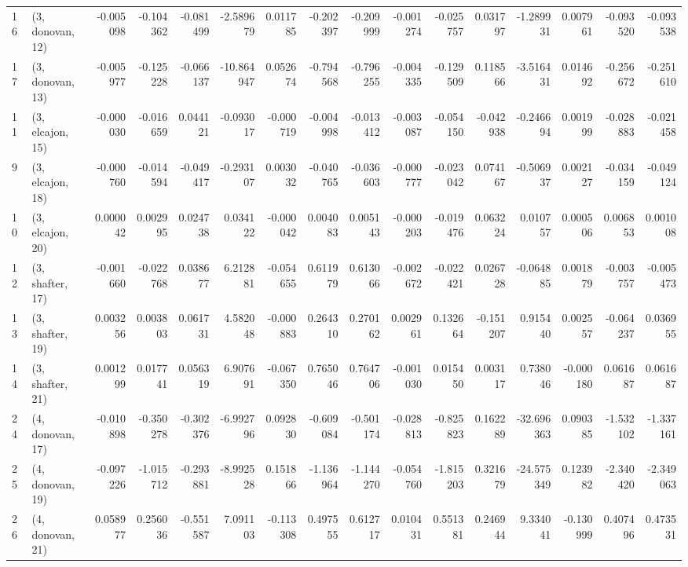 \begin{tabular}{llrrrrrrrrrrrrrr}
16 &  (3, donovan, 12) &  -0.005098 & -0.104362 & -0.081499 &  -2.589679 &  0.011785 &  -0.202397 & -0.209999 & -0.001274 & -0.025757 &  0.031797 &  -1.289931 &  0.007961 & -0.093520 & -0.093538 \\
17 &  (3, donovan, 13) &  -0.005977 & -0.125228 & -0.066137 & -10.864947 &  0.052674 &  -0.794568 & -0.796255 & -0.004335 & -0.129509 &  0.118566 &  -3.516431 &  0.014692 & -0.256672 & -0.251610 \\
11 &  (3, elcajon, 15) &  -0.000030 & -0.016659 &  0.044121 &  -0.093017 & -0.000719 &  -0.004998 & -0.013412 & -0.003087 & -0.054150 & -0.042938 &  -0.246694 &  0.001999 & -0.028883 & -0.021458 \\
9  &  (3, elcajon, 18) &  -0.000760 & -0.014594 & -0.049417 &  -0.293107 &  0.003032 &  -0.040765 & -0.036603 & -0.000777 & -0.023042 &  0.074167 &  -0.506937 &  0.002127 & -0.034159 & -0.049124 \\
10 &  (3, elcajon, 20) &   0.000042 &  0.002995 &  0.024738 &   0.034122 & -0.000042 &   0.004083 &  0.005143 & -0.000203 & -0.019476 &  0.063224 &   0.010757 &  0.000506 &  0.006853 &  0.001008 \\
12 &  (3, shafter, 17) &  -0.001660 & -0.022768 &  0.038677 &   6.212881 & -0.054655 &   0.611979 &  0.613066 & -0.002672 & -0.022421 &  0.026728 &  -0.064885 &  0.001879 & -0.003757 & -0.005473 \\
13 &  (3, shafter, 19) &   0.003256 &  0.003803 &  0.061731 &   4.582048 & -0.000883 &   0.264310 &  0.270162 &  0.002961 &  0.132664 & -0.151207 &   0.915440 &  0.002557 & -0.064237 &  0.036955 \\
14 &  (3, shafter, 21) &   0.001299 &  0.017741 &  0.056319 &   6.907691 & -0.067350 &   0.765046 &  0.764706 & -0.001030 &  0.015450 &  0.003117 &   0.738046 & -0.000180 &  0.061687 &  0.061687 \\
24 &  (4, donovan, 17) &  -0.010898 & -0.350278 & -0.302376 &  -6.992796 &  0.092830 &  -0.609084 & -0.501174 & -0.028813 & -0.825823 &  0.162289 & -32.696363 &  0.090385 & -1.532102 & -1.337161 \\
25 &  (4, donovan, 19) &  -0.097226 & -1.015712 & -0.293881 &  -8.992528 &  0.151866 &  -1.136964 & -1.144270 & -0.054760 & -1.815203 &  0.321679 & -24.575349 &  0.123982 & -2.340420 & -2.349063 \\
26 &  (4, donovan, 21) &   0.058977 &  0.256036 & -0.551587 &   7.091103 & -0.113308 &   0.497555 &  0.612717 &  0.010431 &  0.551381 &  0.246944 &   9.334041 & -0.130999 &  0.407496 &  0.473531 \\

\end{tabular}
